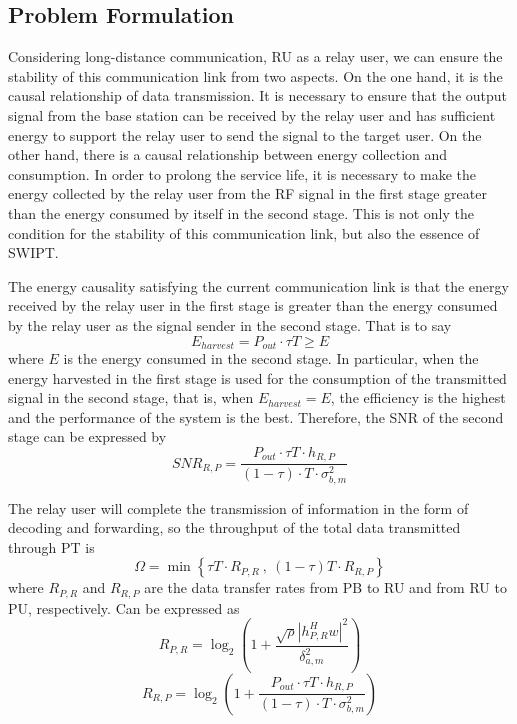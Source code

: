 \documentclass[conference]{IEEEtran}
\begin{document}
\subsection{Problem Formulation}\label{BB}

Considering long-distance communication, RU as a relay user, we can ensure the stability of this communication link from two aspects. On the one hand, it is the causal relationship of data transmission. It is necessary to ensure that the output signal from the base station can be received by the relay user and has sufficient energy to support the relay user to send the signal to the target user. On the other hand, there is a causal relationship between energy collection and consumption. In order to prolong the service life, it is necessary to make the energy collected by the relay user from the RF signal in the first stage greater than the energy consumed by itself in the second stage. This is not only the condition for the stability of this communication link, but also the essence of SWIPT.

The energy causality satisfying the current communication link is that the energy received by the relay user in the first stage is greater than the energy consumed by the relay user as the signal sender in the second stage. That is to say 
\begin{equation}\label{eqn-1}
E_{harvest}=P_{out}\cdot \tau T\ge E
\end{equation}
where $E$ is the energy consumed in the second stage. In particular, when the energy harvested in the first stage is used for the consumption of the transmitted signal in the second stage, that is, when $E_{harvest}= E$, the efficiency is the highest and the performance of the system is the best. Therefore, the SNR of the second stage can be expressed by 
\begin{equation}\label{eqn-1}
SNR_{R,P}  =\frac{P_{out}\cdot \tau T\cdot h_{R,P}  }{\left ( 1-\tau   \right ) \cdot T\cdot \sigma _{b,m}^{2}}
\end{equation}

The relay user will complete the transmission of information in the form of decoding and forwarding, so the throughput of the total data transmitted through PT is 
\begin{equation}\label{eqn-1}
\Omega = \min\left \{ \tau T\cdot R_{P,R} \ ,\ \left ( 1-\tau  \right )T\cdot R_{R,P} \right \}
\end{equation}
where $R_{P,R}$ and $R_{R,P}$ are the data transfer rates from PB to RU and from RU to PU, respectively.  Can be expressed as
\begin{equation}\label{eqn-1}
R_{P,R} = \log_{2}\left ( 1+\frac{\sqrt{\rho }\left |h_{P,R}^{H}w   \right |^{2}   }{\delta _{a,m}^{2} }  \right )
\end{equation}
\begin{equation}\label{eqn-1}
R_{R,P} = \log_{2}\left ( 1+\frac{P_{out}\cdot \tau T\cdot h_{R,P}  }{\left ( 1-\tau   \right ) \cdot T\cdot \sigma _{b,m}^{2}}  \right )
\end{equation}
\end{document}
